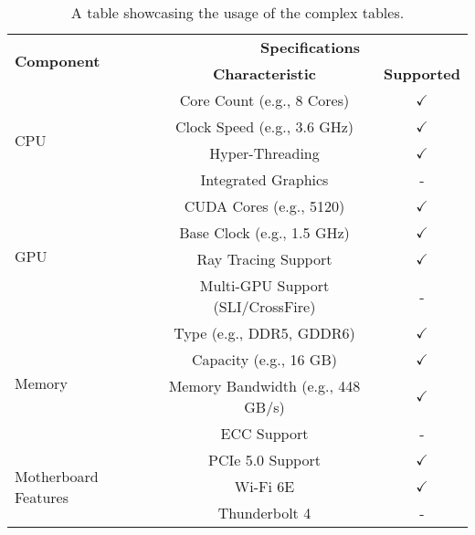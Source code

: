 {	\begin{table}[!htpb]
		\caption{A table showcasing the usage of the complex tables.}
		\label{tab:table-04}
		\centering
		\begin{tabular}{lcc}
			\toprule
			\multirow{2}{*}{\textbf{Component}}   & \multicolumn{2}{c}{\textbf{Specifications}}                      \\
			\cmidrule(lr){2-3}
			                                      & \textbf{Characteristic}                     & \textbf{Supported} \\
			\midrule
			\multirow{4}{*}{CPU}                  & Core Count (e.g., 8 Cores)                  & $\checkmark$       \\
			                                      & Clock Speed (e.g., 3.6 GHz)                 & $\checkmark$       \\
			                                      & Hyper-Threading                             & $\checkmark$       \\
			                                      & Integrated Graphics                         & -                  \\
			\midrule
			\multirow{4}{*}{GPU}                  & CUDA Cores (e.g., 5120)                     & $\checkmark$       \\
			                                      & Base Clock (e.g., 1.5 GHz)                  & $\checkmark$       \\
			                                      & Ray Tracing Support                         & $\checkmark$       \\
			                                      & Multi-GPU Support (SLI/CrossFire)           & -                  \\
			\midrule
			\multirow{4}{*}{Memory}               & Type (e.g., DDR5, GDDR6)                    & $\checkmark$       \\
			                                      & Capacity (e.g., 16 GB)                      & $\checkmark$       \\
			                                      & Memory Bandwidth (e.g., 448 GB/s)           & $\checkmark$       \\
			                                      & ECC Support                                 & -                  \\
			\midrule
			\multirow{3}{*}{Motherboard Features} & PCIe 5.0 Support                            & $\checkmark$       \\
			                                      & Wi-Fi 6E                                    & $\checkmark$       \\
			                                      & Thunderbolt 4                               & -                  \\
			\bottomrule
		\end{tabular}
	\end{table}

}

